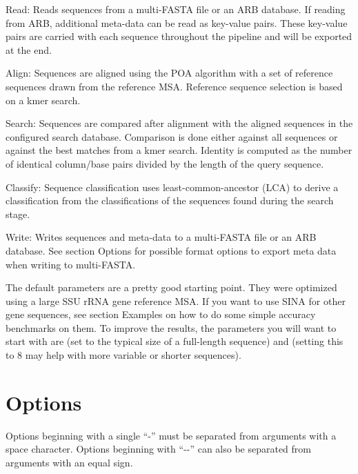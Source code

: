 \documentclass[english,a4paper]{article}
\begin{document}
\begin{Description}[Classify:]
\item[Read:    ] Reads sequences from a multi-FASTA file or an ARB database. If reading from ARB, additional 
meta-data can be read as key-value pairs. These key-value pairs are carried with each sequence throughout 
the pipeline and will be exported at the end. 
\item[Align:] Sequences are aligned using the POA algorithm with a set of reference sequences drawn from the reference 
MSA. Reference sequence selection is based on a kmer search.
\item[Search:] Sequences are compared after alignment with the aligned sequences in the configured search database.
Comparison is done either against all sequences or against the best matches from a kmer search. Identity is 
computed as the number of identical column/base pairs divided by the length of the query sequence.
\item[Classify:] Sequence classification uses least-common-ancestor (LCA) to derive a classification from the
classifications of the sequences found during the search stage. 
\item[Write:] Writes sequences and meta-data to a multi-FASTA file or an ARB database. See section Options for 
possible format options to export meta data when writing to multi-FASTA.
\end{Description}

The default parameters are a pretty good starting point. They were optimized using a large SSU rRNA gene reference
MSA. If you want to use SINA for other gene sequences, see section Examples on how to do some simple 
accuracy benchmarks on them. To improve the results, the parameters you will want to start with are 
 (set to the typical size of a full-length sequence) and  (setting
this to 8 may help with more variable or shorter sequences). 

\section{Options}
Options beginning with a single ``-'' must be separated from arguments with a space character. Options beginning 
with ``-{}-'' can also be separated from arguments with an equal sign. 
\end{document}
